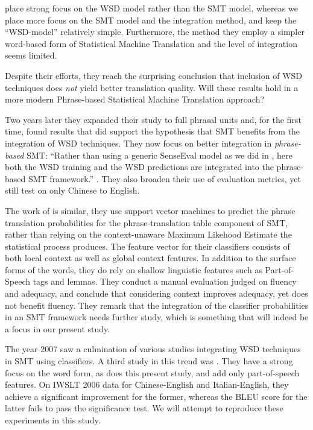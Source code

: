 \documentclass[smallextended]{svjour3}       %
\theoremstyle{break}
\begin{document}
\cite{CarpuatWu05} place strong focus on the WSD model rather than the SMT
model, whereas we place more focus on the SMT model and the integration method,
and keep the ``WSD-model'' relatively simple. Furthermore, the method they
employ a simpler word-based form of Statistical Machine Translation and the
level of integration seems limited.

Despite their efforts, they reach the surprising conclusion that inclusion of
WSD techniques does \emph{not} yield better translation quality. Will these
results hold in a more modern Phrase-based Statistical Machine Translation
approach?

Two years later they expanded their study to full phrasal units
\citep{CarpuatWu07} and, for the first time, found results that did support the
hypothesis that SMT benefits from the integration of WSD techniques. They now
focus on better integration in \emph{phrase-based} SMT: ``Rather than using a
generic SenseEval model as we did in \cite{CarpuatWu05}, here both the WSD
training and the WSD predictions are integrated into the phrase-based SMT
framework.'' \citep{CarpuatWu07}. They also broaden their use of evaluation
metrics, yet still test on only Chinese to English.

The work of \cite{Gimenez+07} is similar, they use support vector machines to
predict the phrase translation probabilities for the phrase-translation table
component of SMT, rather than relying on the context-unaware Maximum Likehood
Estimate the statistical process produces. The feature vector for their
classifiers consists of both local context as well as global context features.
In addition to the surface forms of the words, they do rely on shallow
linguistic features such as Part-of-Speech tags and lemmas. They conduct a
manual evaluation judged on fluency and adequacy, and conclude that considering
context improves adequacy, yet does not benefit fluency. They remark that the
integration of the classifier probabilities in an SMT framework needs further
study, which is something that will indeed be a focus in our present study.

The year 2007 saw a culmination of various studies integrating WSD techniques in
SMT using classifiers. A third study in this trend was \cite{Stroppa+07}. They
have a strong focus on the word form, as does this present study, and add only
part-of-speech features. On IWSLT 2006 data for Chinese-English and
Italian-English, they achieve a significant improvement for the former, whereas
the BLEU score for the latter fails to pass the significance test. We will
attempt to reproduce these experiments in this study.
\end{document}
